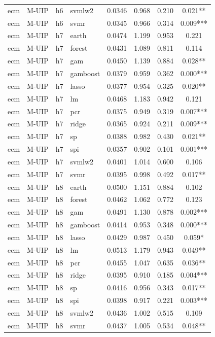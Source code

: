 \begin{ThreePartTable}
\begin{longtable}[t]{llclcccc}
ecm & M-UIP & h6 & svmlw2 & 0.0346 & 0.968 & 0.210 & 0.021**\\
ecm & M-UIP & h6 & svmr & 0.0345 & 0.966 & 0.314 & 0.009***\\
\addlinespace
ecm & M-UIP & h7 & earth & 0.0474 & 1.199 & 0.953 & 0.221\\
ecm & M-UIP & h7 & forest & 0.0431 & 1.089 & 0.811 & 0.114\\
ecm & M-UIP & h7 & gam & 0.0450 & 1.139 & 0.884 & 0.028**\\
ecm & M-UIP & h7 & gamboost & 0.0379 & 0.959 & 0.362 & 0.000***\\
ecm & M-UIP & h7 & lasso & 0.0377 & 0.954 & 0.325 & 0.020**\\
ecm & M-UIP & h7 & lm & 0.0468 & 1.183 & 0.942 & 0.121\\
ecm & M-UIP & h7 & pcr & 0.0375 & 0.949 & 0.319 & 0.007***\\
ecm & M-UIP & h7 & ridge & 0.0365 & 0.924 & 0.211 & 0.009***\\
ecm & M-UIP & h7 & sp & 0.0388 & 0.982 & 0.430 & 0.021**\\
ecm & M-UIP & h7 & spi & 0.0357 & 0.902 & 0.101 & 0.001***\\
ecm & M-UIP & h7 & svmlw2 & 0.0401 & 1.014 & 0.600 & 0.106\\
ecm & M-UIP & h7 & svmr & 0.0395 & 0.998 & 0.492 & 0.017**\\
\addlinespace
ecm & M-UIP & h8 & earth & 0.0500 & 1.151 & 0.884 & 0.102\\
ecm & M-UIP & h8 & forest & 0.0462 & 1.062 & 0.772 & 0.123\\
ecm & M-UIP & h8 & gam & 0.0491 & 1.130 & 0.878 & 0.002***\\
ecm & M-UIP & h8 & gamboost & 0.0414 & 0.953 & 0.348 & 0.000***\\
ecm & M-UIP & h8 & lasso & 0.0429 & 0.987 & 0.450 & 0.059*\\
ecm & M-UIP & h8 & lm & 0.0513 & 1.179 & 0.943 & 0.049**\\
ecm & M-UIP & h8 & pcr & 0.0455 & 1.047 & 0.635 & 0.036**\\
ecm & M-UIP & h8 & ridge & 0.0395 & 0.910 & 0.185 & 0.004***\\
ecm & M-UIP & h8 & sp & 0.0416 & 0.956 & 0.343 & 0.017**\\
ecm & M-UIP & h8 & spi & 0.0398 & 0.917 & 0.221 & 0.003***\\
ecm & M-UIP & h8 & svmlw2 & 0.0436 & 1.002 & 0.515 & 0.109\\
ecm & M-UIP & h8 & svmr & 0.0437 & 1.005 & 0.534 & 0.048**\\

\end{longtable}
\end{ThreePartTable}
